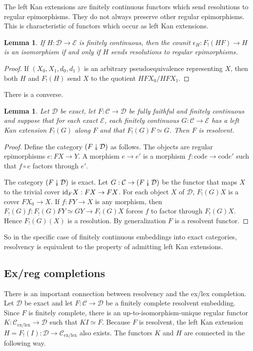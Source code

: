 \documentclass[sort&compress]{elsarticle}
\theoremstyle{plain}
\newtheorem{lemma}[theorem]{Lemma}
\theoremstyle{definition}
\theoremstyle{remark}
\newcommand\cat\mathcal
\newcommand{\downepi}{\mathbin{\rotatebox[origin=c]{-90}{$\twoheadrightarrow$}}}
\newcommand\exlex{_\mathrm{ex/lex}}\newcommand\exreg{_\mathrm{ex/reg}}
\begin{document}
The left Kan extensions are finitely continuous functors which send resolutions to regular epimorphisms. They do not always preserve other regular epimorphisms. This is characteristic of functors which occur as left Kan extensions.

\begin{lemma} If $H:\cat D\to \cat E$ is finitely continuous, then the counit $\epsilon_H:F_!(HF)\to H$ is an isomorphism if and only if $H$ sends resolutions to regular epimorphisms. \end{lemma}

\begin{proof} If $(X_0,X_1,d_0,d_1)$ is an arbitrary pseudoequivalence representing $X$, then both $H$ and $F_!(H)$ send $X$ to the quotient $HFX_0/HFX_1$. \end{proof}

There is a converse.

\begin{lemma} Let $\cat D$ be exact, let $F:\cat C\to \cat D$ be fully faithful and finitely continuous and suppose that for each exact $\cat E$, each finitely continuous $G:\cat C\to \cat E$ has a left Kan extension $F_!(G)$ along $F$ and that $F_!(G)F\simeq G$. Then $F$ is resolvent.\label{converse} \end{lemma}

\newcommand\cod{\mathrm{cod}}
\begin{proof} Define the category $(F\downepi \cat D)$ as follows. The objects are regular epimorphisms $e:FX \to Y$. A morphism $e\to e'$ is a morphism $f:\cod e \to \cod e'$ such that $f\circ e$ factors through $e'$.

The category $(F\downepi \cat D)$ is exact. Let $G:\cat C\to (F\downepi \cat D)$ be the functor that maps $X$ to the trivial cover $\mathrm{id}_FX:FX\to FX$. For each object $X$ of $\cat D$, $F_!(G)X$ is a cover $FX_0 \to X$. If $f:FY\to X$ is any morphism, then $F_!(G)f: F_!(G)FY\simeq GY \to F_!(G)X$ forces $f$ to factor through $F_!(G)X$. Hence $F_!(G)(X)$ is a resolution. By generalization $F$ is a resolvent functor.
\end{proof} %

So in the specific case of finitely continuous embeddings into exact categories, resolvency is equivalent to the property of admitting left Kan extensions.

\subsection{Ex/reg completions}
There is an important connection between resolvency and the ex/lex completion. Let $\cat D$ be exact and let $F:\cat C \to \cat D$ be a finitely complete resolvent embedding. Since $F$ is finitely complete, there is an up-to-isomorphism-unique regular functor $K:\cat C\exlex \to \cat D$ such that $KI\simeq F$. Because $F$ is resolvent, the left Kan extension $H=F_!(I):\cat D\to\cat C\exlex$ also exists. The functors $K$ and $H$ are connected in the following way.
\end{document}

